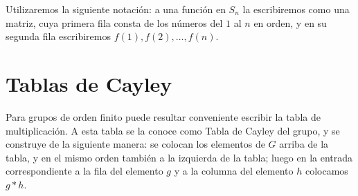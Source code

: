 \documentclass{report}
\begin{document}
Utilizaremos la siguiente notación: a una función en $S_n$ la escribiremos como una matriz, cuya primera fila consta de los números del $1$ al $n$ en orden, y en su segunda fila escribiremos $f(1),f(2),\dots,f(n)$.
\newpage\section{Tablas de Cayley}
Para grupos de orden finito puede resultar conveniente escribir la tabla de multiplicación. A esta tabla se la conoce como Tabla de Cayley del grupo, y se construye de la siguiente manera: se colocan los elementos de $G$ arriba de la tabla, y en el mismo orden también a la izquierda de la tabla; luego en la entrada correspondiente a la fila del elemento $g$ y a la columna del elemento $h$ colocamos $g*h$.
\end{document}
